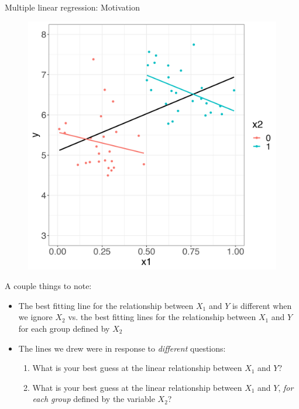 \documentclass[10pt,t]{beamer}
\begin{document}
\begin{frame}{Multiple linear regression: Motivation}
\begin{figure}
	\centering \includegraphics[scale=0.2]{multreg4.png}
\end{figure}

\vspace{0.1cm}

A couple things to note:

\begin{itemize}
	\item The best fitting line for the relationship between $X_1$ and $Y$ is different when we ignore $X_2$ vs. the best fitting lines for the relationship between $X_1$ and $Y$ for each group defined by $X_2$
	\item The lines we drew were in response to \textit{different} questions:
	\begin{enumerate}
		\item What is your best guess at the linear relationship between $X_1$ and $Y$?
		\item What is your best guess at the linear relationship between $X_1$ and $Y$, \textit{for each group} defined by the variable $X_2$? 
	\end{enumerate}
\end{itemize}

\end{frame}
\end{document}
